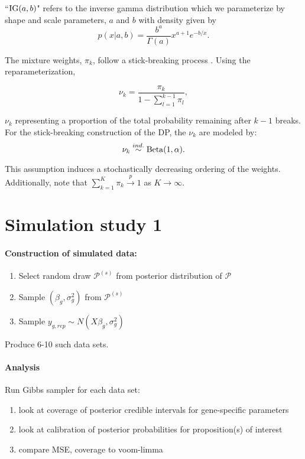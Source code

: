 ``$\operatorname{IG}(a,b)$" refers to the inverse gamma distribution which we parameterize by shape and scale parameters, $a$ and $b$ with density given by
\begin{equation*}
p(x|a,b) = \frac{b^a}{\Gamma(a)}x^{a+1}e^{-b/x}.
\end{equation*}


The mixture weights, $\pi_k$,  follow a stick-breaking process \cite{sethuraman}. Using the reparameterization,

\begin{equation}
\nu_k = \frac{\pi_k}{1 - \sum_{l=1}^{k-1} \pi_l},
\end{equation}

$\nu_k$ representing a proportion of the total probability remaining after $k-1$ breaks. For the stick-breaking construction of the DP, the $\nu_k$ are modeled by:
\begin{equation}
\nu_k \stackrel{ind.}{\sim} \operatorname{Beta}(1, \alpha).
\end{equation}

This assumption induces a stochastically decreasing ordering of the weights. Additionally, note that $\sum_{k=1}^K \pi_k \stackrel{p}{\rightarrow} 1$ as $K\rightarrow \infty$. 

\section{Simulation study 1}

\paragraph{Construction of simulated data:}
\begin{enumerate}
\item Select random draw $\mathcal{P}^{(s)}$ from posterior distribution of $\mathcal{P}$

\item Sample $(\beta_g,\sigma^2_g)$ from $\mathcal{P}^{(s)}$

\item Sample $y_{g,rep} \sim N(X\beta_g,\sigma^2_g)$
\end{enumerate}
Produce 6-10 such data sets.\\

\paragraph{Analysis}

Run Gibbs sampler for each data set:
\begin{enumerate}
\item look at coverage of posterior credible intervals for gene-specific parameters

\item look at calibration of posterior probabilities for proposition(s) of interest

\item compare MSE, coverage to voom-limma

\end{enumerate}

